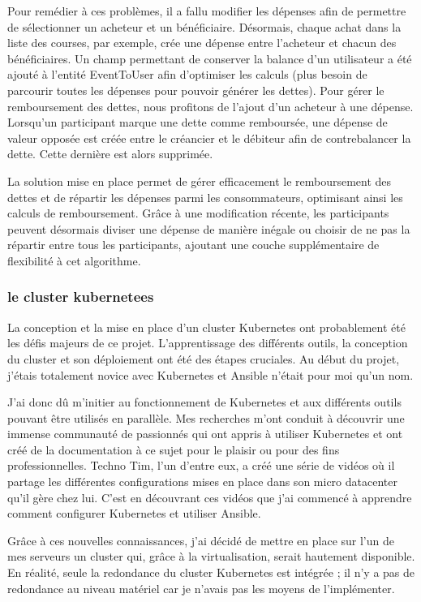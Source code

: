 Pour remédier à ces problèmes, il a fallu modifier les dépenses afin de permettre de sélectionner un acheteur et un bénéficiaire.
Désormais, chaque achat dans la liste des courses, par exemple, crée une dépense entre l'acheteur et chacun des bénéficiaires.
Un champ permettant de conserver la balance d'un utilisateur a été ajouté à l'entité EventToUser afin d'optimiser les calculs (plus besoin de parcourir toutes les dépenses pour pouvoir générer les dettes).
Pour gérer le remboursement des dettes, nous profitons de l'ajout d'un acheteur à une dépense.
Lorsqu'un participant marque une dette comme remboursée, une dépense de valeur opposée est créée entre le créancier et le débiteur afin de contrebalancer la dette.
Cette dernière est alors supprimée.

La solution mise en place permet de gérer efficacement le remboursement des dettes et de répartir les dépenses parmi les consommateurs,
optimisant ainsi les calculs de remboursement.
Grâce à une modification récente, les participants peuvent désormais diviser une dépense de manière inégale ou choisir de ne pas la répartir entre tous les participants,
ajoutant une couche supplémentaire de flexibilité à cet algorithme.

\subsubsection{le cluster kubernetees}
La conception et la mise en place d'un cluster Kubernetes ont probablement été les défis majeurs de ce projet.
L'apprentissage des différents outils, la conception du cluster et son déploiement ont été des étapes cruciales.
Au début du projet, j'étais totalement novice avec Kubernetes et Ansible n'était pour moi qu'un nom.

J'ai donc dû m'initier au fonctionnement de Kubernetes et aux différents outils pouvant être utilisés en parallèle.
Mes recherches m'ont conduit à découvrir une immense communauté de passionnés qui ont appris à utiliser Kubernetes
et ont créé de la documentation à ce sujet pour le plaisir ou pour des fins professionnelles.
Techno Tim, l'un d'entre eux, a créé une série de vidéos où il partage les différentes configurations mises en place
dans son micro datacenter qu'il gère chez lui.
C'est en découvrant ces vidéos que j'ai commencé à apprendre comment configurer Kubernetes et utiliser Ansible.

Grâce à ces nouvelles connaissances, j'ai décidé de mettre en place sur l'un de mes serveurs un cluster qui,
grâce à la virtualisation, serait hautement disponible.
En réalité, seule la redondance du cluster Kubernetes est intégrée ;
il n'y a pas de redondance au niveau matériel car je n'avais pas les moyens de l'implémenter.

